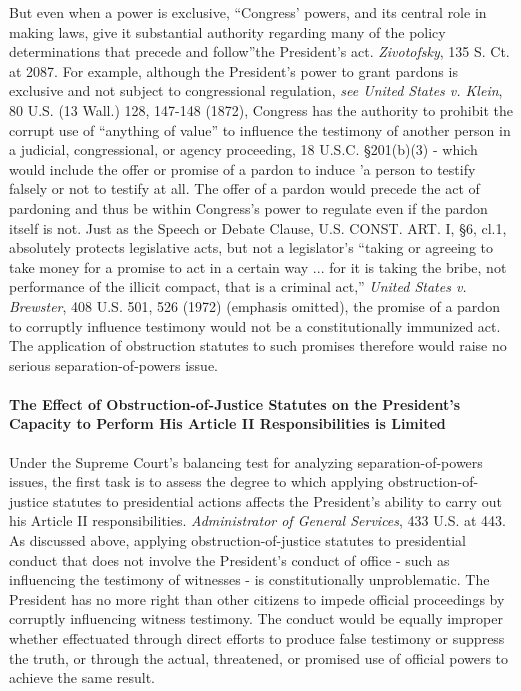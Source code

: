 But even when a power is exclusive, “Congress’ powers, and its central role in making laws, give it substantial authority regarding many of the policy determinations that precede and follow”the President’s act.
\textit{Zivotofsky}, 135 S. Ct. at 2087.
For example, although the President’s power to grant pardons is exclusive and not subject to congressional regulation, \textit{see United States v. Klein}, 80 U.S. (13 Wall.) 128, 147-148 (1872), Congress has the authority to prohibit the corrupt use of “anything of value” to influence the testimony of another person in a judicial, congressional, or agency proceeding, 18 U.S.C. \S 201(b)(3) - which would include the offer or promise of a pardon to induce ’a person to testify falsely or not to testify at all.
The offer of a pardon would precede the act of pardoning and thus be within Congress’s power to regulate even if the pardon itself is not.
Just as the Speech or Debate Clause, U.S. CONST. ART. I, \S 6, cl.1, absolutely protects legislative acts, but not a legislator’s “taking or agreeing to take money for a promise to act in a certain way ... for it is taking the bribe, not performance of the illicit compact, that is a criminal act,” \textit{United States v. Brewster}, 408 U.S. 501, 526 (1972) (emphasis omitted), the promise of a pardon to corruptly influence testimony would not be a constitutionally immunized act.
The application of obstruction statutes to such promises therefore would raise no serious separation-of-powers issue.

\paragraph{The Effect of Obstruction-of-Justice Statutes on the President’s Capacity to Perform His Article II Responsibilities is Limited}

Under the Supreme Court’s balancing test for analyzing separation-of-powers issues, the first task is to assess the degree to which applying obstruction-of-justice statutes to presidential actions affects the President’s ability to carry out his Article II responsibilities.
\textit{Administrator of General Services}, 433 U.S. at 443.
As discussed above, applying obstruction-of-justice statutes to presidential conduct that does not involve the President’s conduct of office - such as influencing the testimony of witnesses - is constitutionally unproblematic.
The President has no more right than other citizens to impede official proceedings by corruptly influencing witness testimony.
The conduct would be equally improper whether effectuated through direct efforts to produce false testimony or suppress the truth, or through the actual, threatened, or promised use of official powers to achieve the same result.

